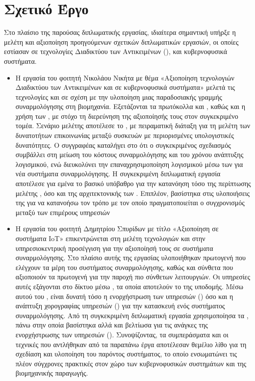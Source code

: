 \section{Σχετικό Έργο}
Στο πλαίσιο της παρούσας διπλωματικής εργασίας, ιδιαίτερα σημαντική υπήρξε η μελέτη και αξιοποίηση προηγούμενων
σχετικών διπλωματικών εργασιών, οι οποίες εστίασαν σε τεχνολογίες Διαδικτύου των Αντικειμένων (),
 και κυβερνοφυσικά συστήματα.
\begin{itemize}
  \item Η εργασία του φοιτητή Νικολάου Νικήτα με θέμα «Αξιοποίηση τεχνολογιών Διαδικτύου των Αντικειμένων και 
    σε κυβερνοφυσικά συστήματα» μελετά τις τεχνολογίες  και  σε σχέση με την υλοποίηση μιας παραδοσιακής
    γραμμής συναρμολόγησης στη βιομηχανία. Εξετάζονται τα πρωτόκολλα  και , καθώς και η χρήση
    των , με στόχο τη διερεύνηση της αξιοποίησής τους στον συγκεκριμένο τομέα. Σενάριο μελέτης
    αποτέλεσε το , με πειραματική διάταξη για τη μελέτη των δυνατοτήτων επικοινωνίας
    μεταξύ συσκευών με περιορισμένες υπολογιστικές δυνατότητες. Ο συγγραφέας καταλήγει στο ότι ο συγκεκριμένος σχεδιασμός
    συμβάλλει στη μείωση του κόστους συναρμολόγησης και του χρόνου ανάπτυξης λογισμικού, ενώ διευκολύνει την
    επαναχρησιμοποίηση λογισμικού μέσω των  για νέα συστήματα συναρμολόγησης.
    Η συγκεκριμένη διπλωματική εργασία αποτέλεσε για εμένα το βασικό υπόβαθρο για την κατανόηση τόσο της περίπτωσης μελέτης
    , όσο και της αρχιτεκτονικής των . Επιπλέον, βασίστηκα στις υλοποιήσεις της για να κατανοήσω
    τον τρόπο με τον οποίο πραγματοποιείται ο συγχρονισμός μεταξύ των επιμέρους υπηρεσιών
  \item Η εργασία του φοιτητή Δημητρίου Σπυρίδων με τίτλο «Αξιοποίηση  σε συστήματα IoT»
    επικεντρώνεται στη μελέτη τεχνολογιών  και στην υπηρεσιοκεντρική προσέγγιση για την αξιοποίησή τους σε
    συστήματα συναρμολόγησης. Στο πλαίσιο αυτής της εργασίας υλοποιήθηκαν πρωτογενή  που
    ελέγχουν τα μέρη του συστήματος συναρμολόγησης, καθώς και σύνθετα  που αξιοποιούν
    τα πρωτογενή για την παροχή πιο σύνθετων λειτουργιών. Οι υπηρεσίες αυτές εξάγονται στο δίκτυο μέσω  ,
    τα οποία αποτελούν το  της υποδομής. Μέσω αυτού του , είναι δυνατή τόσο η ενορχήστρωση των
    υπηρεσιών () όσο και η ανάπτυξη χορογραφίας υπηρεσιών ()
    για την κατασκευή ενός συστήματος συναρμολόγησης. Από τη συγκεκριμένη διπλωματική εργασία χρησιμοποίησα τα ,
    πάνω στην οποία βασίστηκα αλλά και βελτίωσα για τις ανάγκες της
    ενορχήστρωσης των υπηρεσιών ().
    Συνοψίζοντας, τα συμπεράσματα και οι τεχνικές που αντλήθηκαν από τα παραπάνω έργα αποτέλεσαν θεμέλιο λίθο
    για τη σχεδίαση και υλοποίηση του παρόντος συστήματος, το οποίο ενσωματώνει τις
    πλέον σύγχρονες πρακτικές στον χώρο των κυβερνοφυσικών συστημάτων και της βιομηχανικής παραγωγής.
\end{itemize}

